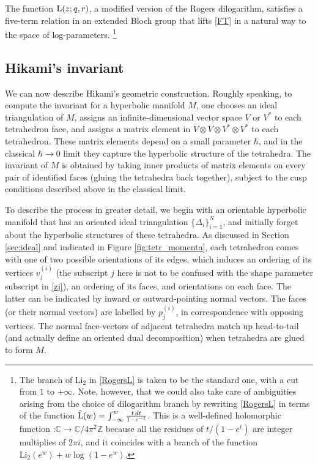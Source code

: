 \documentclass[hyper]{JHEP3}
\newcommand{\C}{{\mathbb{C}}}
\newcommand{\Z}{{\mathbb{Z}}}
\def\Li{\text{Li}_2}
\begin{document}
%
The function ${\rm L} (z;q,r)$, a modified version of the Rogers dilogarithm, satisfies a five-term relation in an extended Bloch group that lifts \eqref{FT} in a natural way to the space of log-parameters.%
\footnote{The branch of $\Li$ in \eqref{RogersL} is taken to be the standard one, with a cut from $1$ to $+\infty$. Note, however, that we could also take care of ambiguities arising from the choice of dilogarithm branch by rewriting \eqref{RogersL} in terms of the function $\tilde{\rm L}(w)=\int_{-\infty}^w \frac{t\,dt}{1-e^{-t}}$. This is a well-defined holomorphic function :\;$\C\rightarrow \C/4\pi^2\Z$ because all the residues of $t/(1-e^t)$ are integer multiplies of $2\pi i$, and it coincides with a branch of the function $\Li(e^w)+w\log(1-e^w)$.}





\subsection{Hikami's invariant}
\label{sec:Hikami}

We can now describe Hikami's geometric construction.
Roughly speaking, to compute the invariant for a hyperbolic manifold $M$,
one chooses an ideal triangulation of $M$, assigns an infinite-dimensional
vector space $V$ or $V^*$ to each tetrahedron face, and assigns a matrix element in
$V\otimes V\otimes V^* \otimes V^*$ to each tetrahedron.
These matrix elements depend on a small parameter $\hbar$,
and in the classical $\hbar \to 0$ limit they capture the hyperbolic structure of the tetrahedra.
The invariant of $M$ is obtained by taking inner products
of matrix elements on every pair of identified faces (gluing the tetrahedra back together),
subject to the cusp conditions described above in the classical limit.

To describe the process in greater detail,
we begin with an orientable hyperbolic manifold 
that has an oriented ideal triangulation $\{\Delta_i\}_{i=1}^N$,
and initially forget about the hyperbolic structures of these tetrahedra. As discussed in Section \ref{sec:ideal} and indicated in Figure \ref{fig:tetr_momenta}, each tetrahedron comes with one of two possible orientations of its edges, which induces an ordering of its vertices $v_j^{(i)}$ (the subscript $j$ here is not to be confused with the shape parameter subscript in \eqref{zj}), an ordering of its faces, and orientations on each face.
The latter can be indicated by inward or outward-pointing normal vectors. The faces (or their normal vectors) are labelled by $p_j^{(i)}$, in correspondence with opposing vertices.
The normal face-vectors of adjacent tetrahedra match up head-to-tail
(and actually define an oriented dual decomposition) when tetrahedra are glued to form $M$.
\end{document}
